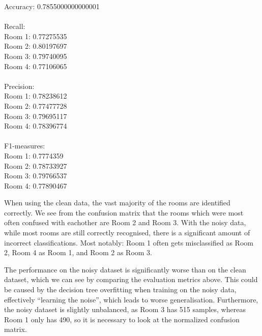 \documentclass{article}
\begin{document}
Accuracy: 0.7855000000000001 \\
\\
Recall: \\
Room 1: 0.77275535 \\
Room 2: 0.80197697 \\
Room 3: 0.79740095 \\
Room 4: 0.77106065 \\
\\
Precision: \\
Room 1: 0.78238612 \\
Room 2: 0.77477728 \\
Room 3: 0.79695117 \\
Room 4: 0.78396774 \\
\\
F1-measures: \\
Room 1: 0.7774359 \\
Room 2: 0.78733927  \\
Room 3: 0.79766537 \\
Room 4: 0.77890467 \\

\pagebreak


When using the clean data, the vast majority of the rooms are identified
correctly. We see from the confusion matrix that the rooms which were most
often confused with eachother are Room 2 and Room 3. With the noisy data,
while most rooms are still correctly recognised, there is a significant
amount of incorrect classifications. Most notably: Room 1 often gets misclassified as
Room 2, Room 4 as Room 1, and Room 2 as Room 3.
\

The performance on the noisy dataset is significantly worse than on the clean
dataset, which we can see by comparing the evaluation metrics above. This
could be caused by the decision tree overfitting when training on the noisy
data, effectively ``learning the noise'', which leads to worse generalisation.
Furthermore, the noisy dataset is slightly unbalanced, as Room 3 has 515
samples, whereas Room 1 only has 490, so it is necessary to look at the
normalized confusion matrix.
\end{document}
